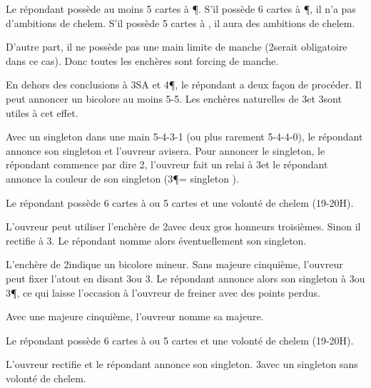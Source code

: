 \newpage

\titre{1\NT -- 2\C -- 2\P}

Le répondant possède au moins 5 cartes à \P. S'il possède 6 cartes à \P, il n'a pas d'ambitions de chelem. S'il possède 5 cartes à \C, il aura des ambitions de chelem.

D'autre part, il ne possède pas une main limite de manche (2\T serait obligatoire dans ce cas). Donc toutes les enchères sont forcing de manche.

En dehors des conclusions à 3SA et 4\P, le répondant a deux façon de procéder. Il peut annoncer un bicolore au moins 5-5. Les enchères naturelles de 3\T et 3\K sont utiles à cet effet.

Avec un singleton dans une main 5-4-3-1 (ou plus rarement 5-4-4-0), le répondant annonce son singleton et l'ouvreur avisera. Pour annoncer le singleton, le répondant commence par dire 2\NT, l'ouvreur fait un relai à 3\T et le répondant annonce la couleur de son singleton (3\P = singleton \T).




\newpage

\titre{1\NT -- 2\P}

Le répondant possède 6 cartes à \T ou 5 cartes et une volonté de chelem (19-20H).

L'ouvreur peut utiliser l'enchère de 2\NT avec deux gros honneurs troisièmes. Sinon il rectifie à 3\T. Le répondant nomme alors éventuellement son singleton.

\newpage

\titre{1\NT -- 2\NT}

L'enchère de 2\NT indique un bicolore mineur. Sans majeure cinquième, l'ouvreur peut fixer l'atout en disant 3\T ou 3\K.
Le répondant annonce alors son singleton à 3\C ou 3\P, ce qui laisse l'occasion à l’ouvreur de freiner avec des points perdus.

Avec une majeure cinquième, l'ouvreur nomme sa majeure.

\newpage

\titre{1\NT -- 3\T}


Le répondant possède 6 cartes à \K ou 5 cartes et une volonté de chelem (19-20H).

L'ouvreur rectifie et le répondant annonce son singleton. 3\NT avec un singleton \T sans volonté de chelem.

\newpage
